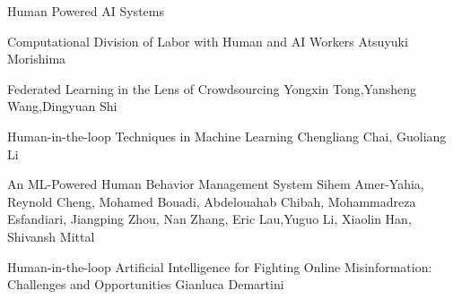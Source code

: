 \documentclass[11pt]{article}
\begin{document}
\begin{bulletin}
\begin{articlesection}{Human Powered AI Systems}
\begin{article}
	{Computational Division of Labor with Human and AI Workers}
	{Atsuyuki Morishima}
	
\end{article}

\begin{article}
	{Federated Learning in the Lens of Crowdsourcing}
	{Yongxin Tong,Yansheng Wang,Dingyuan Shi
	}
	
\end{article}

\begin{article}
	{Human-in-the-loop Techniques in Machine Learning}
	{Chengliang Chai, Guoliang Li}
	
\end{article}

\begin{article}
		{An ML-Powered Human Behavior Management System}
		{Sihem Amer-Yahia, Reynold Cheng, Mohamed Bouadi,
			Abdelouahab Chibah, Mohammadreza Esfandiari, 
			Jiangping Zhou, Nan Zhang, Eric Lau,Yuguo Li,
			Xiaolin Han, Shivansh Mittal
		}
		
\end{article}
\begin{article}
	{Human-in-the-loop Artificial Intelligence for Fighting Online Misinformation: Challenges and Opportunities}
	{Gianluca Demartini}
	
\end{article}




\end{articlesection}


\end{bulletin}
\end{document}
